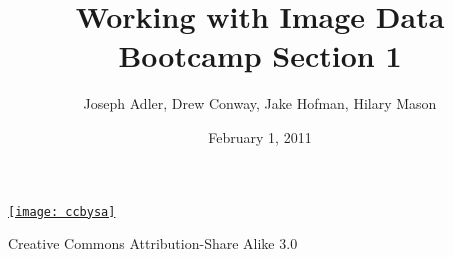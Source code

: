 \documentclass[xcolor=dvipsnames, 9pt]{beamer}
\title{Working with Image Data\\Bootcamp Section 1}
\author{Joseph Adler, Drew Conway, Jake Hofman, Hilary Mason}
\date{February 1, 2011}
\begin{document}
 

\begin{frame}[plain]
  \titlepage 
  
  \tiny
  \href{http://creativecommons.org/licenses/by-sa/3.0/us/}{\texttt{[image: ccbysa]}}

  Creative Commons Attribution-Share Alike 3.0
\end{frame}
\end{document}
